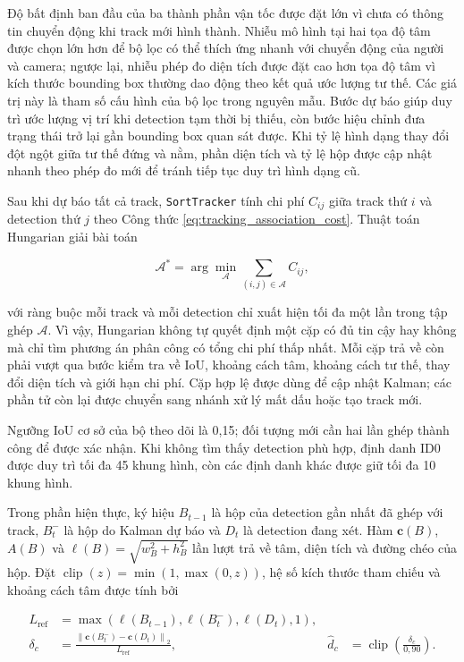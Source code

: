 Độ bất định ban đầu của ba thành phần vận tốc được đặt lớn vì chưa có thông tin chuyển động khi track mới hình thành. Nhiễu mô hình tại hai tọa độ tâm được chọn lớn hơn để bộ lọc có thể thích ứng nhanh với chuyển động của người và camera; ngược lại, nhiễu phép đo diện tích được đặt cao hơn tọa độ tâm vì kích thước bounding box thường dao động theo kết quả ước lượng tư thế. Các giá trị này là tham số cấu hình của bộ lọc trong nguyên mẫu. Bước dự báo giúp duy trì ước lượng vị trí khi detection tạm thời bị thiếu, còn bước hiệu chỉnh đưa trạng thái trở lại gần bounding box quan sát được. Khi tỷ lệ hình dạng thay đổi đột ngột giữa tư thế đứng và nằm, phần diện tích và tỷ lệ hộp được cập nhật nhanh theo phép đo mới để tránh tiếp tục duy trì hình dạng cũ.

Sau khi dự báo tất cả track, \texttt{SortTracker} tính chi phí $C_{ij}$ giữa track thứ $i$ và detection thứ $j$ theo Công thức \ref{eq:tracking_association_cost}. Thuật toán Hungarian giải bài toán

\begin{equation}
\mathcal{A}^{*}=\arg\min_{\mathcal{A}}
\sum_{(i,j)\in\mathcal{A}} C_{ij},
\label{eq:hungarian_tracking_assignment}
\end{equation}

với ràng buộc mỗi track và mỗi detection chỉ xuất hiện tối đa một lần trong tập ghép $\mathcal{A}$. Vì vậy, Hungarian không tự quyết định một cặp có đủ tin cậy hay không mà chỉ tìm phương án phân công có tổng chi phí thấp nhất. Mỗi cặp trả về còn phải vượt qua bước kiểm tra về IoU, khoảng cách tâm, khoảng cách tư thế, thay đổi diện tích và giới hạn chi phí. Cặp hợp lệ được dùng để cập nhật Kalman; các phần tử còn lại được chuyển sang nhánh xử lý mất dấu hoặc tạo track mới.

Ngưỡng IoU cơ sở của bộ theo dõi là 0,15; đối tượng mới cần hai lần ghép thành công để được xác nhận. Khi không tìm thấy detection phù hợp, định danh ID0 được duy trì tối đa 45 khung hình, còn các định danh khác được giữ tối đa 10 khung hình.

Trong phần hiện thực, ký hiệu $B_{t-1}$ là hộp của detection gần nhất đã ghép với track, $B_t^{-}$ là hộp do Kalman dự báo và $D_t$ là detection đang xét. Hàm $\mathbf{c}(B)$, $A(B)$ và $\ell(B)=\sqrt{w_B^2+h_B^2}$ lần lượt trả về tâm, diện tích và đường chéo của hộp. Đặt $\operatorname{clip}(z)=\min(1,\max(0,z))$, hệ số kích thước tham chiếu và khoảng cách tâm được tính bởi

\begin{align}
L_{\mathrm{ref}}&=\max\!\left(\ell(B_{t-1}),\ell(B_t^{-}),\ell(D_t),1\right),
\label{eq:tracking_reference_diagonal}\\
\delta_c&=\frac{\left\lVert\mathbf{c}(B_t^{-})-\mathbf{c}(D_t)\right\rVert_2}{L_{\mathrm{ref}}},
&\hat d_c&=\operatorname{clip}\!\left(\frac{\delta_c}{0{,}90}\right).
\label{eq:tracking_center_distance}
\end{align}

